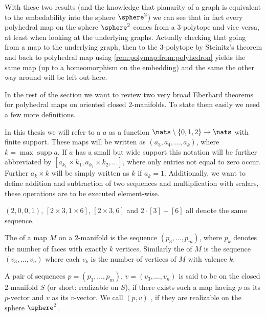 With these two results (and the knowledge that planarity of a graph is equivalent to the embedability into the sphere $\sphere^2$) we can see that in fact every polyhedral map on the sphere $\sphere^2$ comes from a $3$-polytope and vice versa, at least when looking at the underlying graphs. Actually checking that going from a map to the underlying graph, then to the $3$-polytope by {\sc Steinitz}'s theorem and back to polyhedral map using \autoref{rem:polymap:from:polyhedron} yields the same map (up to a homeomorphism on the embedding) and the same the other way around will be left out here.

\medskip\smallskip
In the rest of the section we want to review two very broad {\sc Eberhard} theorems for polyhedral maps on oriented closed $2$-manifolds. To state them easily we need a few more definitions.

\begin{definition}[Sequence]
  In this thesis we will refer to a  $a$ as a function \linebreak$\nats \setminus \{0, 1, 2\} \to \nats$ with finite support. These maps will be written as $(a_3, a_4, ..., a_k)$, where $k = \operatorname{max} \operatorname{supp} a$. If $a$ has a small but wide support this notation will be further abbreviated by $[a_{k_1} \times k_1, a_{k_2} \times k_2, ...]$, where only entries not equal to zero occur. Further $a_k \times k$ will be simply written as $k$ if $a_k = 1$. Additionally, we want to define addition and subtraction of two sequences and multiplication with scalars, these operations are to be executed element-wise.
\end{definition}
\begin{example}
  $(2, 0, 0, 1)$, $[2 \times 3, 1 \times 6]$, $[2 \times 3, 6]$ and $2 \cdot [3] + [6]$ all denote the same sequence.
\end{example}
\begin{definition}\label{def:vectors}
  The  of a map $M$ on a $2$-manifold is the sequence $(p_3, \dots, p_m)$, where $p_k$ denotes the number of faces with exactly $k$ vertices. Similarly the  of $M$ is the sequence $(v_3, \dots, v_n)$ where each $v_k$ is the number of vertices of $M$ with valence $k$.
\end{definition}

\begin{definition}\label{def:realizable}
  A pair of sequences $p = (p_3, \dots, p_m)$, $v = (v_3, \dots, v_n)$ is said to be  on the closed $2$-manifold $S$ (or short: realizable on $S$), if there exists such a map having $p$ as its $p$-vector and $v$ as its $v$-vector. We call $(p, v)$ , if they are realizable on the sphere $\sphere^2$.
\end{definition}

